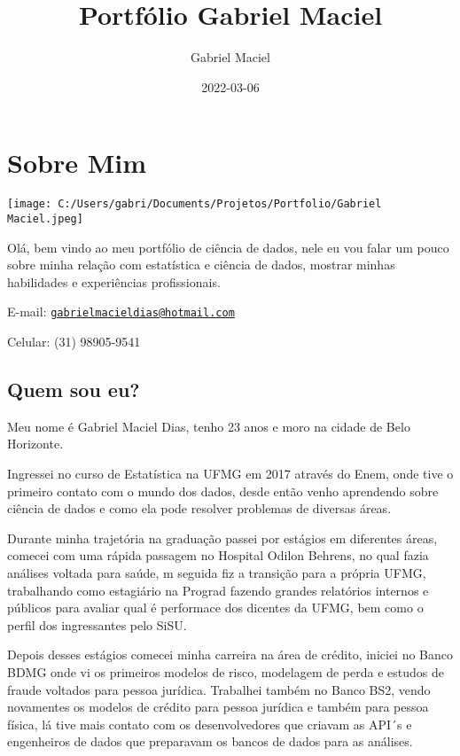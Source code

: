 \documentclass[
]{book}
\title{Portfólio Gabriel Maciel}
\author{Gabriel Maciel}
\date{2022-03-06}
\begin{document}
\maketitle

{
\setcounter{tocdepth}{1}
\tableofcontents
}
\hypertarget{sobre-mim}{%
\chapter{Sobre Mim}\label{sobre-mim}}

\texttt{[image: C:/Users/gabri/Documents/Projetos/Portfolio/Gabriel Maciel.jpeg]}

Olá, bem vindo ao meu portfólio de ciência de dados, nele eu vou falar um pouco sobre minha relação com estatística e ciência de dados, mostrar minhas habilidades e experiências profissionais.

E-mail: \href{mailto:gabrielmacieldias@hotmail.com}{\nolinkurl{gabrielmacieldias@hotmail.com}}

Celular: (31) 98905-9541

\hypertarget{quem-sou-eu}{%
\section{Quem sou eu?}\label{quem-sou-eu}}

Meu nome é Gabriel Maciel Dias, tenho 23 anos e moro na cidade de Belo Horizonte.

Ingressei no curso de Estatística na UFMG em 2017 através do Enem, onde tive o primeiro contato com o mundo dos dados, desde então venho aprendendo sobre ciência de dados e como ela pode resolver problemas de diversas áreas.

Durante minha trajetória na graduação passei por estágios em diferentes áreas, comecei com uma rápida passagem no Hospital Odilon Behrens, no qual fazia análises voltada para saúde, m seguida fiz a transição para a própria UFMG, trabalhando como estagiário na Prograd fazendo grandes relatórios internos e públicos para avaliar qual é performace dos dicentes da UFMG, bem como o perfil dos ingressantes pelo SiSU.

Depois desses estágios comecei minha carreira na área de crédito, iniciei no Banco BDMG onde vi os primeiros modelos de risco, modelagem de perda e estudos de fraude voltados para pessoa jurídica. Trabalhei também no Banco BS2, vendo novamentes os modelos de crédito para pessoa jurídica e também para pessoa física, lá tive mais contato com os desenvolvedores que criavam as API´s e engenheiros de dados que preparavam os bancos de dados para as análises.
\end{document}
